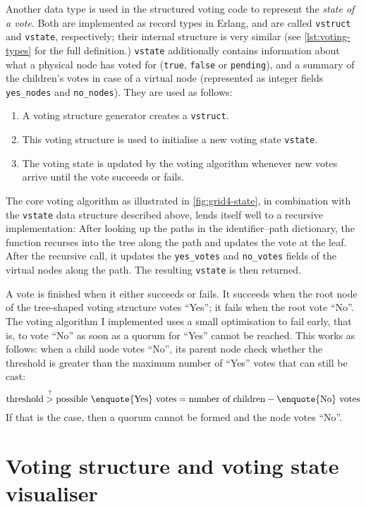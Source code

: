 \documentclass[11pt,chapterprefix=true,toc=bibliography,numbers=noendperiod,
               footnotes=multiple,twoside]{scrreprt}
\begin{document}
Another data type is used in the structured voting code to represent the \emph{state of a vote}. Both are implemented as record types in Erlang, and are called \texttt{vstruct} and \texttt{vstate}, respectively; their internal structure is very similar (see \cref{lst:voting-types} for the full definition.) \texttt{vstate} additionally contains information about what a physical node has voted for (\texttt{true}, \texttt{false} or \texttt{pending}), and a summary of the children's votes in case of a virtual node (represented as integer fields \texttt{yes\_nodes} and \texttt{no\_nodes}). They are used as follows:

\begin{enumerate}
    \item A voting structure generator creates a \texttt{vstruct}.
    \item This voting structure is used to initialise a new voting state \texttt{vstate}.
    \item The voting state is updated by the voting algorithm whenever new votes arrive until the vote succeeds or fails.
\end{enumerate}

The core voting algorithm as illustrated in \cref{fig:grid4-state}, in combination with the \texttt{vstate} data structure described above, lends itself well to a recursive implementation: After looking up the paths in the identifier--path dictionary, the function recurses into the tree along the path and updates the vote at the leaf. After the recursive call, it updates the \texttt{yes\_votes} and \texttt{no\_votes} fields of the virtual nodes along the path. The resulting \texttt{vstate} is then returned.

A vote is finished when it either succeeds or fails. It succeeds when the root node of the tree-shaped voting structure votes \enquote{Yes}; it fails when the root vote \enquote{No}. The voting algorithm I implemented uses a small optimisation to fail early, that is, to vote \enquote{No} as soon as a quorum for \enquote{Yes} cannot be reached. This works as follows: when a child node votes \enquote{No}, its parent node check whether the threshold is greater than the maximum number of \enquote{Yes} votes that can still be cast: \[ \text{threshold} \overset{?}{>} \text{possible \enquote{Yes} votes} = \text{number of children} - \text{\enquote{No} votes} \] If that is the case, then a quorum cannot be formed and the node votes \enquote{No}.

\section{Voting structure and voting state visualiser\label{sc:visualiser}}
\end{document}

